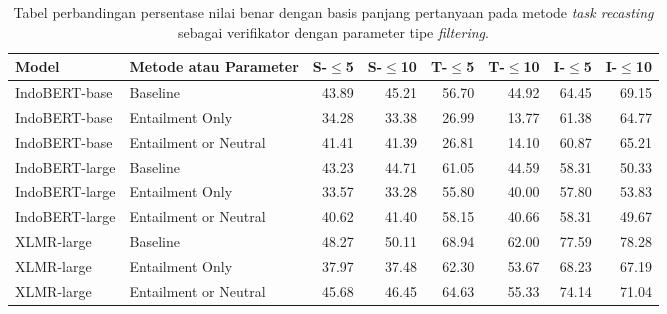 \begin{table}[H]\centering
\small
\begin{tabular}{llrrrrrr}
\toprule
         Model &                Metode atau Parameter &  S-$\leq$5 &  S-$\leq$10 &  T-$\leq$5 &  T-$\leq$10 &  I-$\leq$5 &  I-$\leq$10 \\
\midrule
 IndoBERT-base &              Baseline &                   43.89 &                    45.21 &                   56.70 &                    44.92 &                   64.45 &                    69.15 \\
 IndoBERT-base &       Entailment Only &                   34.28 &                    33.38 &                   26.99 &                    13.77 &                   61.38 &                    64.77 \\
 IndoBERT-base & Entailment or Neutral &                   41.41 &                    41.39 &                   26.81 &                    14.10 &                   60.87 &                    65.21 \\
\hline
IndoBERT-large &              Baseline &                   43.23 &                    44.71 &                   61.05 &                    44.59 &                   58.31 &                    50.33 \\
IndoBERT-large &       Entailment Only &                   33.57 &                    33.28 &                   55.80 &                    40.00 &                   57.80 &                    53.83 \\
IndoBERT-large & Entailment or Neutral &                   40.62 &                    41.40 &                   58.15 &                    40.66 &                   58.31 &                    49.67 \\
\hline
    XLMR-large &              Baseline &                   48.27 &                    50.11 &                   68.94 &                    62.00 &                   77.59 &                    78.28 \\
    XLMR-large &       Entailment Only &                   37.97 &                    37.48 &                   62.30 &                    53.67 &                   68.23 &                    67.19 \\
    XLMR-large & Entailment or Neutral &                   45.68 &                    46.45 &                   64.63 &                    55.33 &                   74.14 &                    71.04 \\
\bottomrule
\end{tabular}
\caption{Tabel perbandingan persentase nilai benar dengan basis panjang pertanyaan pada metode \emph{task recasting} sebagai verifikator dengan parameter tipe \emph{filtering}.}
\end{table}

